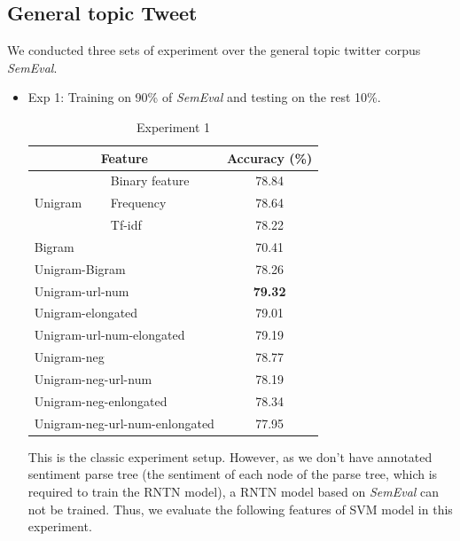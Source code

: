 \subsection{General topic Tweet}
We conducted three sets of experiment over the general topic twitter corpus \textit{SemEval}. 
\begin{itemize}
\item Exp 1: Training on 90\% of \textit{SemEval} and testing on the rest 10\%. \\

\begin{table}[H]
  \begin{center}
    \begin{tabular}{llc}\hline
     \multicolumn{2}{c}{Feature} & Accuracy (\%)     \\\hline
     \multirow{3}{*}{Unigram}    & Binary feature  &  78.84  \\ 
                                 & Frequency       &  78.64  \\ 
                                 & Tf-idf          &  78.22 \\
     \multicolumn{2}{l}{Bigram}                    &  70.41 \\  
     \multicolumn{2}{l}{Unigram-Bigram}            &  78.26 \\         
     \multicolumn{2}{l}{Unigram-url-num}           &  \textbf{79.32} \\
     \multicolumn{2}{l}{Unigram-elongated}         &  79.01 \\
     \multicolumn{2}{l}{Unigram-url-num-elongated} &  79.19 \\
     \multicolumn{2}{l}{Unigram-neg}               &  78.77 \\
     \multicolumn{2}{l}{Unigram-neg-url-num}       &  78.19 \\
     \multicolumn{2}{l}{Unigram-neg-enlongated}    &  78.34 \\
     \multicolumn{2}{l}{Unigram-neg-url-num-enlongated}  &  77.95 \\\hline      
    \end{tabular}
    \end{center}
    \caption{\label{exp5_1} Experiment 1}
\end{table}
This is the classic experiment setup. However, as we don't have annotated sentiment parse tree  (the sentiment of each node of the parse tree, which is required to train the RNTN model), a RNTN model based on \textit{SemEval} can not be trained. Thus, we evaluate the following features of SVM model in this experiment. 



\end{itemize}
